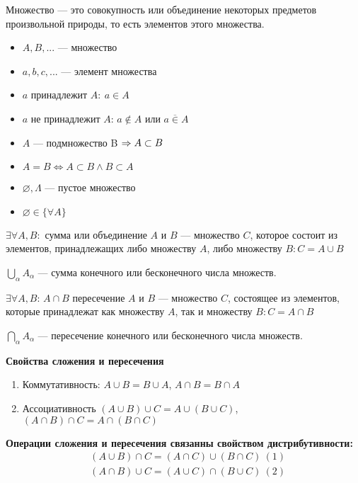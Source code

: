 \documentclass{article}
\begin{document}


Множество --- это совокупность или объединение некоторых предметов произвольной природы, то есть элементов этого множества.

\begin{itemize}
	\item $A, B, ...$ ---  множество
	\item $a, b, c, ...$ --- элемент множества
	\item $a$ принадлежит $A: \ a\in A$
	\item $a$ не принадлежит $A$: $a\notin A$ или $a \overline {\in}  A$
	\item $A$ --- подмножество B $\Rightarrow A \subset B$
	\item $A = B \Leftrightarrow  A \subset B \wedge B \subset A$
	\item $\varnothing, \Lambda$ --- пустое множество
	\item $\varnothing \in \{ \forall A\}$
\end{itemize}


$\exists \forall A, B:$ сумма или объединение $A$ и $B$ --- множество $C$, которое состоит из элементов, принадлежащих либо множеству $A$, либо множеству $B: C = A \cup B$

$\bigcup\limits_{\alpha} A_\alpha$ --- сумма конечного или бесконечного числа множеств.


$\exists \forall A, B$:  $A \cap B$  пересечение $A$ и $B$ --- множество $C$, состоящее из элементов, которые принадлежат как множеству $A$, так и множеству $B: C = A \cap B$

$\bigcap\limits_{\alpha} A_\alpha$ --- пересечение конечного или бесконечного числа множеств.

{\bf Свойства сложения и пересечения}
\begin{enumerate}
	\item Коммутативность: $A \cup B = B \cup A$, $A \cap B = B \cap A$

	\item Ассоциативность $(A \cup B) \cup C  = A \cup (B \cup C) $, $ (A \cap B) \cap C = A \cap (B \cap C)$
\end{enumerate}
{\bf Операции сложения и пересечения связанны свойством дистрибутивности:}
\begin{align*}
	 & (A \cup B) \cap C  = (A \cap C) \cup (B \cap C) \ (1) \\
	 & (A \cap B) \cup C = (A \cup C) \cap (B \cup C) \ (2)  \\
\end{align*}
\proof {}
\end{document}
